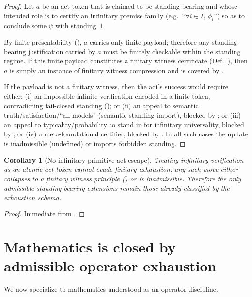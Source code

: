 \documentclass[11pt]{article}
\newtheorem{corollary}[theorem]{Corollary}
\theoremstyle{definition}
\begin{document}
\begin{proof}
Let $a$ be an act token that is claimed to be standing-bearing and whose intended role is to
certify an infinitary premise family (e.g.\ ``$\forall i\in I,\ \phi_i$'') so as to conclude some
$\psi$ with standing~$1$.

By finite presentability (), $a$ carries only finite payload; therefore
any standing-bearing justification carried by $a$ must be finitely checkable within the standing
regime. If this finite payload constitutes a finitary witness certificate (Def.\ ),
then $a$ is simply an instance of finitary witness compression and is covered by
.

If the payload is not a finitary witness, then the act's success would require either:
(i) an impossible infinite verification encoded in a finite token, contradicting fail-closed
standing (); or
(ii) an appeal to semantic truth/satisfaction/``all models'' (semantic standing import), blocked by
; or
(iii) an appeal to typicality/probability to stand in for infinitary universality, blocked by
; or
(iv) a meta-foundational certifier, blocked by .
In all such cases the update is inadmissible (undefined) or imports forbidden standing.
\end{proof}

\begin{corollary}[No infinitary primitive-act escape]
\label{cor:no-primitive-act-escape}
Treating infinitary verification as an atomic act token cannot evade finitary exhaustion: any such
move either collapses to a finitary witness principle () or is
inadmissible. Therefore the only admissible standing-bearing extensions remain those already
classified by the exhaustion schema.
\end{corollary}

\begin{proof}
Immediate from .
\end{proof}


\section{Mathematics is closed by admissible operator exhaustion}
\label{sec:math}

We now specialize  to mathematics understood as an operator discipline.
\end{document}
